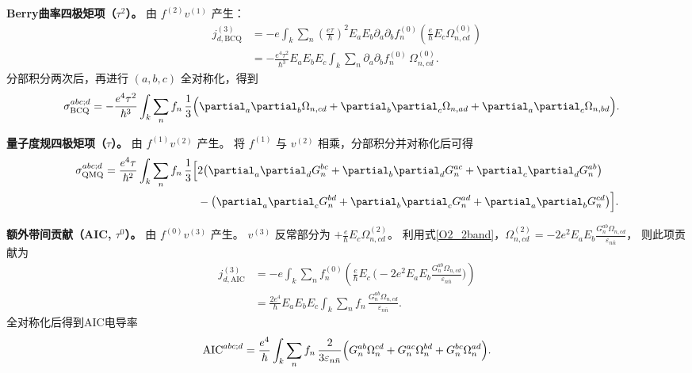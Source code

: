 \textbf{Berry曲率四极矩项（\(\tau^2\)）。} 由 \(f^{(2)}v^{(1)}\) 产生：
\begin{align}
  j_{d,\text{BCQ}}^{(3)}
  &= -e\int_k\sum_n
    \left(\frac{e\tau}{\hbar}\right)^2 E_a E_b \partial_a\partial_b f_n^{(0)}
    \left( \frac{e}{\hbar} E_c \Omega_{n,cd}^{(0)} \right) \nonumber\\
  &= -\frac{e^4\tau^2}{\hbar^3} E_a E_b E_c
    \int_k\sum_n \partial_a\partial_b f_n^{(0)} \, \Omega_{n,cd}^{(0)} .
\end{align}
分部积分两次后，再进行 \((a,b,c)\) 全对称化，得到
\begin{align}
  \sigma_{\text{BCQ}}^{abc;d} =
  -\frac{e^4\tau^2}{\hbar^3} \int_k\sum_n f_n \,
  \frac13\Bigl(
    &\partial_a\partial_b\Omega_{n,cd}
    + \partial_b\partial_c\Omega_{n,ad}
    + \partial_a\partial_c\Omega_{n,bd}
  \Bigr).
  \label{s3_BCQ}
\end{align}

\textbf{量子度规四极矩项（\(\tau\)）。} 由 \(f^{(1)}v^{(2)}\) 产生。
将 \(f^{(1)}\) 与 \(v^{(2)}\) 相乘，分部积分并对称化后可得
\begin{align}
  \sigma_{\text{QMQ}}^{abc;d} =
  \frac{e^4\tau}{\hbar^2} \int_k\sum_n f_n \,
  \frac13\Bigl[
    &2\bigl(
      \partial_a\partial_d G_n^{bc}
    + \partial_b\partial_d G_n^{ac}
    + \partial_c\partial_d G_n^{ab}
    \bigr) \nonumber\\
    &-\bigl(
      \partial_a\partial_c G_n^{bd}
    + \partial_b\partial_c G_n^{ad}
    + \partial_a\partial_b G_n^{cd}
    \bigr)
  \Bigr].
  \label{s3_QMQ}
\end{align}

\textbf{额外带间贡献（AIC, \(\tau^0\)）。} 由 \(f^{(0)}v^{(3)}\) 产生。
\(v^{(3)}\) 反常部分为 \(+\frac{e}{\hbar}E_c\Omega_{n,cd}^{(2)}\)。
利用式\eqref{O2_2band}，\(\Omega_{n,cd}^{(2)} = -2e^2 E_a E_b \frac{G_n^{ab}\Omega_{n,cd}}{\varepsilon_{n\bar n}}\)，
则此项贡献为
\begin{align}
  j_{d,\text{AIC}}^{(3)}
  &= -e\int_k\sum_n f_n^{(0)}
    \left( \frac{e}{\hbar} E_c \, \bigl( -2e^2 E_a E_b \frac{G_n^{ab}\Omega_{n,cd}}{\varepsilon_{n\bar n}} \bigr) \right) \nonumber\\
  &= \frac{2e^4}{\hbar} E_a E_b E_c
    \int_k\sum_n f_n \,
    \frac{G_n^{ab}\Omega_{n,cd}}{\varepsilon_{n\bar n}} .
\end{align}
全对称化后得到AIC电导率
\begin{equation}
  \mathrm{AIC}^{abc;d} =
  \frac{e^4}{\hbar} \int_k\sum_n f_n \,
  \frac{2}{3\varepsilon_{n\bar n}}\Bigl(
    G_n^{ab}\Omega_n^{cd}
  + G_n^{ac}\Omega_n^{bd}
  + G_n^{bc}\Omega_n^{ad}
  \Bigr).
  \label{s3_AIC}
\end{equation}

